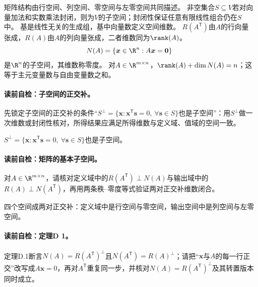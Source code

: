 矩阵结构由行空间、列空间、零空间与左零空间共同描述。
非空集合$S\subseteq V$若对向量加法和实数乘法封闭，则为$V$的子空间；封闭性保证任意有限线性组合仍在$S$中。
基是线性无关的生成组，基中向量数定义空间维数。
$R(A^{\mathsf T})$由$A$的行向量张成，$R(A)$由$A$的列向量张成，二者维数同为$\rank(A)$。
\[
N(A)=\{\boldsymbol{x}\in\R^n:A\boldsymbol{x}=\boldsymbol0\}
\]
是$\R^n$的子空间，其维数称零度。
对$A\in\R^{m\times n}$，$\rank(A)+\dim N(A)=n$；这等于主元变量数与自由变量数之和。
\paragraph{读前自检：子空间的正交补。}先锁定子空间的正交补的条件“$S^{\perp}=\{\boldsymbol{x}:\boldsymbol{x}^{\mathsf T}\boldsymbol{s}=0,\ \forall\boldsymbol{s}\in S\}$也是子空间”：用$S^{\perp}$做一次维数或封闭性核对，所得结果应满足所得维数与定义域、值域的空间一致。\par

$S^{\perp}=\{\boldsymbol{x}:\boldsymbol{x}^{\mathsf T}\boldsymbol{s}=0,\ \forall\boldsymbol{s}\in S\}$也是子空间。
\paragraph{读前自检：矩阵的基本子空间。}对$A\in\R^{m\times n}$，请核对定义域中的$R(A^{\mathsf T})\perp N(A)$与输出域中的$R(A)\perp N(A^{\mathsf T})$，再用两条秩--零度等式验证两对正交补维数闭合。\par

四个空间成两对正交补：定义域中是行空间与零空间，输出空间中是列空间与左零空间。
\paragraph{读前自检：定理D 1。}定理D.1断言$N(A)=R(A^{\mathsf T})^{\perp}$且$N(A^{\mathsf T})=R(A)^{\perp}$；请把“$\boldsymbol{x}$与$A$的每一行正交”改写成$A\boldsymbol{x}=0$，再对$A^{\mathsf T}$重复同一步，并核对$N(A)=R(A^{\mathsf T})^\perp$及其转置版本同时成立。\par

